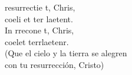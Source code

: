 \begin{cancion}%
	 resurrectie t, Chris,\\
	coeli et ter laetent.\\
	In rrecone t, Chris,\\
	coelet terrlaetenr.\\
(Que el cielo y la tierra se alegren\\
 con tu resurrección, Cristo)\\
\end{cancion}%
